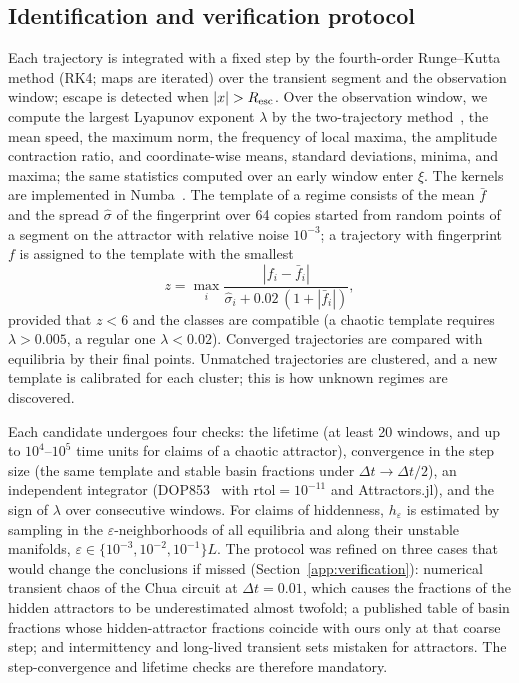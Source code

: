 \subsection{Identification and verification protocol}\label{sec:protocol}

Each trajectory is integrated with a fixed step by the fourth-order Runge--Kutta method (RK4; maps are iterated) over the transient segment and the observation window; escape is detected when $|x|>R_{\rm esc}$. Over the observation window, we compute the largest Lyapunov exponent $\lambda$ by the two-trajectory method~\cite{Benettin1980}, the mean speed, the maximum norm, the frequency of local maxima, the amplitude contraction ratio, and coordinate-wise means, standard deviations, minima, and maxima; the same statistics computed over an early window enter $\xi$. The kernels are implemented in Numba~\cite{Lam2015Numba}. The template of a regime consists of the mean $\bar f$ and the spread $\hat\sigma$ of the fingerprint over 64 copies started from random points of a segment on the attractor with relative noise $10^{-3}$; a trajectory with fingerprint $f$ is assigned to the template with the smallest
\begin{equation}
z=\max_i\frac{|f_i-\bar f_i|}{\hat\sigma_i+0.02\,(1+|\bar f_i|)},
\label{eq:z}
\end{equation}
provided that $z<6$ and the classes are compatible (a chaotic template requires $\lambda>0.005$, a regular one $\lambda<0.02$). Converged trajectories are compared with equilibria by their final points. Unmatched trajectories are clustered, and a new template is calibrated for each cluster; this is how unknown regimes are discovered.

Each candidate undergoes four checks: the lifetime (at least 20 windows, and up to $10^4$--$10^5$ time units for claims of a chaotic attractor), convergence in the step size (the same template and stable basin fractions under $\Delta t\to\Delta t/2$), an independent integrator (DOP853~\cite{Hairer1993} with $\mathrm{rtol}=10^{-11}$ and Attractors.jl), and the sign of $\lambda$ over consecutive windows. For claims of hiddenness, $h_\varepsilon$ is estimated by sampling in the $\varepsilon$-neighborhoods of all equilibria and along their unstable manifolds, $\varepsilon\in\{10^{-3},10^{-2},10^{-1}\}L$. The protocol was refined on three cases that would change the conclusions if missed (Section~\ref{app:verification}): numerical transient chaos of the Chua circuit at $\Delta t=0.01$, which causes the fractions of the hidden attractors to be underestimated almost twofold; a published table of basin fractions whose hidden-attractor fractions coincide with ours only at that coarse step; and intermittency and long-lived transient sets mistaken for attractors. The step-convergence and lifetime checks are therefore mandatory.
